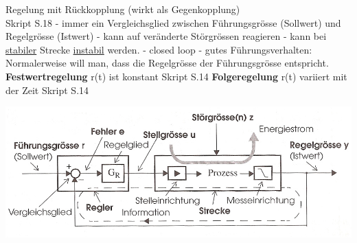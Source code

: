 \begin{description}[leftmargin=2.5cm]
	\begin{minipage}{8cm}
		 \item[Regelung] mit Rückkopplung (wirkt als Gegenkopplung) \\{\color{red} Skript S.18} \newline
		 				 - immer ein Vergleichsglied zwischen Führungsgrösse (Sollwert) und
		 				   Regelgrösse (Istwert) \newline
		 				 - kann auf veränderte Störgrössen reagieren \newline
		 				 - kann bei \underline{stabiler} Strecke \underline{instabil} werden. \newline
						 - closed loop
						 - gutes Führungsverhalten: Normalerweise will man, dass die Regelgrösse der Führungsgrösse entspricht. \newline
						 \textbf{Festwertregelung} r(t) ist konstant {\color{red} Skript S.14} \newline
						 \textbf{Folgeregelung} r(t) variiert mit der Zeit {\color{red} Skript S.14}\newline
	\end{minipage}
	\begin{minipage}{9cm}
		\includegraphics[width=\textwidth]{./bilder/Grundregelkreis_klein.jpg}
	\end{minipage}				
				
\end{description}

